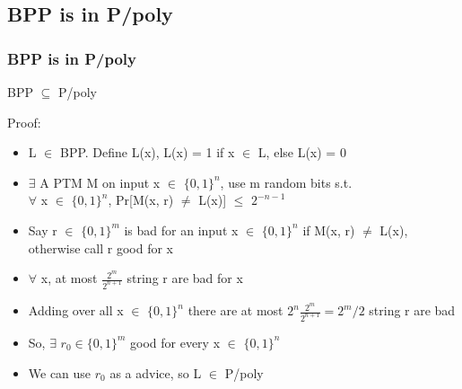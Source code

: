 \documentclass{beamer}
\begin{document}
\subsection{BPP is in P/poly}
\begin{frame}
\frametitle{BPP is in P/poly}
\begin{theorem}
	BPP $\subseteq$ P/poly
\end{theorem}
Proof:
\begin{itemize}
	\item L $\in$ BPP. Define L(x), L(x) = 1 if x $\in$ L, else L(x) = 0
	\item $\exists$ A PTM M on input x $\in$ $\{0,1\}^{n}$, use m random bits s.t.\\
	$\forall$ x $\in$ $\{0,1\}^{n}$, Pr[M(x, r) $\neq$ L(x)] $\leq$ $2^{-n-1}$
	\item Say r $\in$ $\{0,1\}^{m}$ is bad for an input x $\in$ $\{0,1\}^{n}$ if M(x, r) $\neq$ L(x), otherwise call r good for x
	\item $\forall$ x, at most $\frac{2^{m}}{2^{n+1}}$ string r are bad for x
	\item Adding over all x $\in$ $\{0,1\}^{n}$ there are at most $2^{n}\frac{2^{m}}{2^{n+1}} = 2^{m}/2$  string r are bad
	\item So, $\exists$ $r_{0} \in \{0,1\}^{m}$ good for every x $\in$ $\{0,1\}^{n}$
	\item We can use $r_{0}$ as a advice, so L $\in$ P/poly
\end{itemize}
\end{frame}

\end{document}
